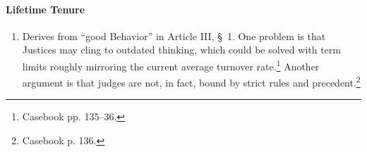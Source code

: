 \paragraph{Lifetime Tenure}

\begin{enumerate}
    \item Derives from ``good Behavior'' in Article III, \S\ 1. One problem is 
    that Justices may cling to outdated thinking, which could be solved with 
    term limits roughly mirroring the current average turnover 
    rate.\footnote{Casebook pp. 135--36.} Another argument is that judges are 
    not, in fact, bound by strict rules and precedent.\footnote{Casebook p. 
    136.}
\end{enumerate}

